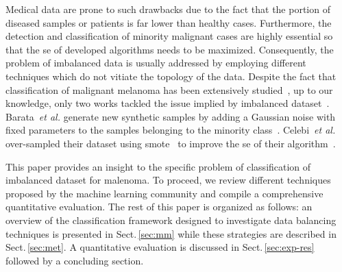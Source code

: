 Medical data are prone to such drawbacks due to the fact that the portion of diseased samples or patients is far lower than healthy cases.
Furthermore, the detection and classification of minority malignant cases are highly essential so that the \ac{se} of developed algorithms needs to be maximized.
Consequently, the problem of imbalanced data is usually addressed by employing different techniques which do not vitiate the topology of the data.
Despite the fact that classification of malignant melanoma has been extensively studied~\cite{rastgoo2015automatic}, up to our knowledge, only two works tackled the issue implied by imbalanced dataset~\cite{barata2013two,celebi2007methodological}.
Barata~\emph{et al.} generate new synthetic samples by adding a Gaussian noise with fixed parameters to the samples belonging to the minority class~\cite{barata2013two}.
Celebi~\emph{et al.} over-sampled their dataset using \ac{smote}~\cite{chawla2002smote} to improve the \ac{se} of their algorithm~\cite{celebi2007methodological}.

This paper provides an insight to the specific problem of classification of imbalanced dataset for malenoma. 
To proceed, we review different techniques proposed by the machine learning community and compile a comprehensive quantitative evaluation. The rest of this paper is organized as follows: an overview of the classification framework designed to investigate data balancing techniques is presented in Sect.\,\ref{sec:mm} while these strategies are described in Sect.\,\ref{sec:met}. A quantitative evaluation is discussed in Sect.\,\ref{sec:exp-res} followed by a concluding section.




